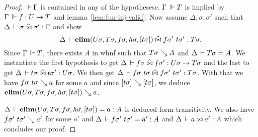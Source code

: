 \documentclass[a4paper,english]{lipics-utf8x}
\begin{document}
  \begin{proof}
    $\,\Vdash \Gamma$ is contained in any of the hypothesese.
    $\Gamma \,\Vdash T$ is implied by $\Gamma \,\Vdash f : U \to T$ and
    lemma~\ref{lem:fun-inj-valid}.
    Now assume $\Delta, \sigma, \sigma'$ such that
    $\Delta \,\vdash \sigma \mathrel{\widehat{\bowtie}} \sigma' : \Gamma$ and
    show
    \[\Delta \,\vdash \operatorname{\mathbf{elim}}(U \sigma,T \sigma,f \sigma,h \sigma,[t \sigma]) \mathrel{\widehat{\bowtie}}
    f \sigma'\ t \sigma' : T \sigma.\]
    Since $\Gamma \,\Vdash T$, there exists $A$ in whnf such that $T \sigma \searrow A$
    and $\Delta \,\vdash T \sigma = A$.
    We instantiate the first hypothesis to get
    $\Delta \,\vdash f \sigma \mathrel{\widehat{\bowtie}} f \sigma' : U \sigma \to T \sigma$
    and the last to get
    $\Delta \,\vdash t \sigma \mathrel{\widehat{\bowtie}} t \sigma' : U \sigma$.
    We then get
    $\Delta \,\vdash f \sigma\ t \sigma \mathrel{\widehat{\bowtie}} f \sigma'\ t \sigma' : T \sigma$.
    With that we have $f \sigma\ t \sigma \searrow a$ for some $a$ and since
    $[t \sigma] \searrow [t \sigma]$, we deduce
    $\operatorname{\mathbf{elim}}(U \sigma,T \sigma,f \sigma,h \sigma,[t \sigma]) \searrow a$.

    \noindent %
    $\Delta \,\vdash \operatorname{\mathbf{elim}}(U \sigma,T \sigma,f \sigma,h \sigma,[t \sigma]) = a : A$
    is deduced form transitivity.
    We also have $f \sigma'\ t \sigma' \searrow a'$ for some $a'$ and
    $\Delta \,\vdash f \sigma'\ t \sigma' = a' : A$
    and $\Delta \,\vdash a \mathrel{\bowtie} a' : A$ which concludes our proof.
  \end{proof}

  \begin{lemma}
    \leavevmode
    \begin{mathc}
    \end{mathc}
  \end{lemma}
\end{document}

